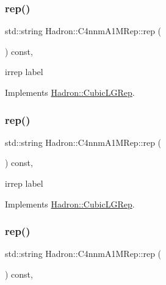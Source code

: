 \subsubsection{\texorpdfstring{rep()}{rep()}\hspace{0.1cm}{\footnotesize\ttfamily [1/3]}}
{\footnotesize\ttfamily std\+::string Hadron\+::\+C4nnm\+A1\+M\+Rep\+::rep (\begin{DoxyParamCaption}{ }\end{DoxyParamCaption}) const\hspace{0.3cm}{\ttfamily [inline]}, {\ttfamily [virtual]}}

irrep label 

Implements \mbox{\hyperlink{structHadron_1_1CubicLGRep_a50f5ddbb8f4be4cee0106fa9e8c75e6c}{Hadron\+::\+Cubic\+L\+G\+Rep}}.

\mbox{\label{structHadron_1_1C4nnmA1MRep_af64812449271d9ce89fbba35fc41f7b7}} 
\subsubsection{\texorpdfstring{rep()}{rep()}\hspace{0.1cm}{\footnotesize\ttfamily [2/3]}}
{\footnotesize\ttfamily std\+::string Hadron\+::\+C4nnm\+A1\+M\+Rep\+::rep (\begin{DoxyParamCaption}{ }\end{DoxyParamCaption}) const\hspace{0.3cm}{\ttfamily [inline]}, {\ttfamily [virtual]}}

irrep label 

Implements \mbox{\hyperlink{structHadron_1_1CubicLGRep_a50f5ddbb8f4be4cee0106fa9e8c75e6c}{Hadron\+::\+Cubic\+L\+G\+Rep}}.

\mbox{\label{structHadron_1_1C4nnmA1MRep_af64812449271d9ce89fbba35fc41f7b7}} 
\subsubsection{\texorpdfstring{rep()}{rep()}\hspace{0.1cm}{\footnotesize\ttfamily [3/3]}}
{\footnotesize\ttfamily std\+::string Hadron\+::\+C4nnm\+A1\+M\+Rep\+::rep (\begin{DoxyParamCaption}{ }\end{DoxyParamCaption}) const\hspace{0.3cm}{\ttfamily [inline]}, {\ttfamily [virtual]}}

